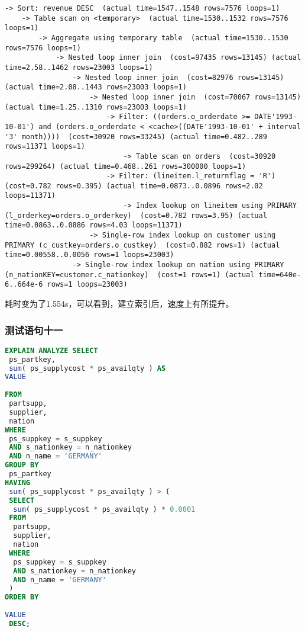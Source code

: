 \documentclass{article}
\begin{document}
\begin{lstlisting}
-> Sort: revenue DESC  (actual time=1547..1548 rows=7576 loops=1)
    -> Table scan on <temporary>  (actual time=1530..1532 rows=7576 loops=1)
        -> Aggregate using temporary table  (actual time=1530..1530 rows=7576 loops=1)
            -> Nested loop inner join  (cost=97435 rows=13145) (actual time=2.58..1462 rows=23003 loops=1)
                -> Nested loop inner join  (cost=82976 rows=13145) (actual time=2.08..1443 rows=23003 loops=1)
                    -> Nested loop inner join  (cost=70067 rows=13145) (actual time=1.25..1310 rows=23003 loops=1)
                        -> Filter: ((orders.o_orderdate >= DATE'1993-10-01') and (orders.o_orderdate < <cache>((DATE'1993-10-01' + interval '3' month))))  (cost=30920 rows=33245) (actual time=0.482..289 rows=11371 loops=1)
                            -> Table scan on orders  (cost=30920 rows=299264) (actual time=0.468..261 rows=300000 loops=1)
                        -> Filter: (lineitem.l_returnflag = 'R')  (cost=0.782 rows=0.395) (actual time=0.0873..0.0896 rows=2.02 loops=11371)
                            -> Index lookup on lineitem using PRIMARY (l_orderkey=orders.o_orderkey)  (cost=0.782 rows=3.95) (actual time=0.0863..0.0886 rows=4.03 loops=11371)
                    -> Single-row index lookup on customer using PRIMARY (c_custkey=orders.o_custkey)  (cost=0.882 rows=1) (actual time=0.00558..0.0056 rows=1 loops=23003)
                -> Single-row index lookup on nation using PRIMARY (n_nationKEY=customer.c_nationkey)  (cost=1 rows=1) (actual time=640e-6..664e-6 rows=1 loops=23003)
\end{lstlisting}

耗时变为了1.554s，可以看到，建立索引后，速度上有所提升。

\subsubsection{测试语句十一}

\begin{lstlisting}[language=sql]
EXPLAIN ANALYZE SELECT
 ps_partkey,
 sum( ps_supplycost * ps_availqty ) AS 
VALUE
 
FROM
 partsupp,
 supplier,
 nation 
WHERE
 ps_suppkey = s_suppkey 
 AND s_nationkey = n_nationkey 
 AND n_name = 'GERMANY' 
GROUP BY
 ps_partkey 
HAVING
 sum( ps_supplycost * ps_availqty ) > (
 SELECT
  sum( ps_supplycost * ps_availqty ) * 0.0001 
 FROM
  partsupp,
  supplier,
  nation 
 WHERE
  ps_suppkey = s_suppkey 
  AND s_nationkey = n_nationkey 
  AND n_name = 'GERMANY' 
 ) 
ORDER BY
 
VALUE
 DESC;
\end{lstlisting}
\end{document}
